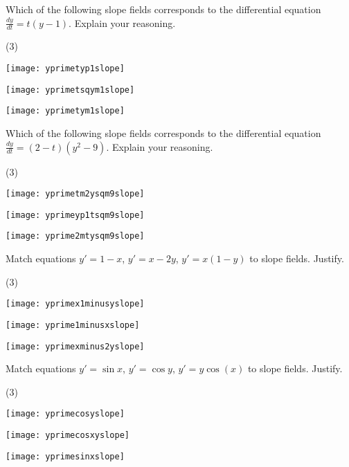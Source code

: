 \documentclass{ximera}
\begin{document}
\begin{exercise}
    Which of the following slope fields corresponds to the differential equation $\frac{dy}{dt} = t(y-1)$. Explain your reasoning.
    \begin{tasks}(3)
        \task \parbox[c]{1.75in}{\texttt{[image: yprimetyp1slope]}}
        \task \parbox[c]{1.75in}{\texttt{[image: yprimetsqym1slope]}}
        \task \parbox[c]{1.75in}{\texttt{[image: yprimetym1slope]}}
    \end{tasks}
\end{exercise}

\begin{exercise}
    Which of the following slope fields corresponds to the differential equation $\frac{dy}{dt} = (2-t)(y^2 - 9)$. Explain your reasoning.
    \begin{tasks}(3)
        \task \parbox[c]{1.75in}{\texttt{[image: yprimetm2ysqm9slope]}}
        \task \parbox[c]{1.75in}{\texttt{[image: yprimeyp1tsqm9slope]}}
        \task \parbox[c]{1.75in}{\texttt{[image: yprime2mtysqm9slope]}}
    \end{tasks}
\end{exercise}


\begin{exercise}
    Match equations $y'=1-x$, $y'=x-2y$, $y' = x(1-y)$ to slope fields. Justify.
    \begin{tasks}(3)
        \task \parbox[c]{1.75in}{\texttt{[image: yprimex1minusyslope]}}
        \task \parbox[c]{1.75in}{\texttt{[image: yprime1minusxslope]}}
        \task \parbox[c]{1.75in}{\texttt{[image: yprimexminus2yslope]}}
    \end{tasks}
\end{exercise}


\begin{exercise}%
    Match equations $y'=\sin x$, $y'=\cos y$, $y' = y\cos(x)$ to slope fields. Justify.
    \begin{tasks}(3)
        \task \parbox[c]{1.75in}{\texttt{[image: yprimecosyslope]}}
        \task \parbox[c]{1.75in}{\texttt{[image: yprimecosxyslope]}}
        \task \parbox[c]{1.75in}{\texttt{[image: yprimesinxslope]}}
    \end{tasks}
\end{exercise}
\end{document}
